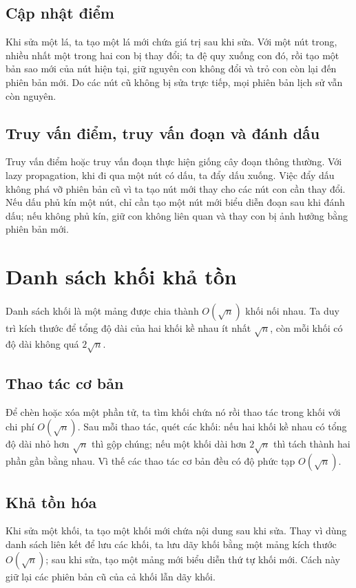 \documentclass[11pt]{article}
\begin{document}
\subsection{Cập nhật điểm}

Khi sửa một lá, ta tạo một lá mới chứa giá trị sau khi sửa. Với một nút
trong, nhiều nhất một trong hai con bị thay đổi; ta đệ quy xuống con
đó, rồi tạo một bản sao mới của nút hiện tại, giữ nguyên con không đổi
và trỏ con còn lại đến phiên bản mới. Do các nút cũ không bị sửa trực
tiếp, mọi phiên bản lịch sử vẫn còn nguyên.

\subsection{Truy vấn điểm, truy vấn đoạn và đánh dấu}

Truy vấn điểm hoặc truy vấn đoạn thực hiện giống cây đoạn thông thường.
Với lazy propagation, khi đi qua một nút có dấu, ta đẩy dấu xuống. Việc
đẩy dấu không phá vỡ phiên bản cũ vì ta tạo nút mới thay cho các nút
con cần thay đổi. Nếu dấu phủ kín một nút, chỉ cần tạo một nút mới biểu
diễn đoạn sau khi đánh dấu; nếu không phủ kín, giữ con không liên quan
và thay con bị ảnh hưởng bằng phiên bản mới.

\section{Danh sách khối khả tồn}

Danh sách khối là một mảng được chia thành $O(\sqrt n)$ khối nối nhau.
Ta duy trì kích thước để tổng độ dài của hai khối kề nhau ít nhất
$\sqrt n$, còn mỗi khối có độ dài không quá $2\sqrt n$.

\subsection{Thao tác cơ bản}

Để chèn hoặc xóa một phần tử, ta tìm khối chứa nó rồi thao tác trong
khối với chi phí $O(\sqrt n)$. Sau mỗi thao tác, quét các khối: nếu hai
khối kề nhau có tổng độ dài nhỏ hơn $\sqrt n$ thì gộp chúng; nếu một
khối dài hơn $2\sqrt n$ thì tách thành hai phần gần bằng nhau. Vì thế
các thao tác cơ bản đều có độ phức tạp $O(\sqrt n)$.

\subsection{Khả tồn hóa}

Khi sửa một khối, ta tạo một khối mới chứa nội dung sau khi sửa. Thay
vì dùng danh sách liên kết để lưu các khối, ta lưu dãy khối bằng một
mảng kích thước $O(\sqrt n)$; sau khi sửa, tạo một mảng mới biểu diễn
thứ tự khối mới. Cách này giữ lại các phiên bản cũ của cả khối lẫn dãy
khối.
\end{document}
